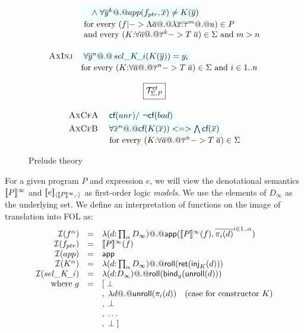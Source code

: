 \documentclass[preprint,nocopyrightspace]{sigplanconf}
\begin{document}
\begin{figure}
\[\begin{array}{c}
\begin{array}{lll}
                  & \formula{\quad\land\; \forall \oln{y}{k} @.@ app(f_{ptr},\xs) \neq K(\ol{y})} \\
                  & \text{ for every } (f |-> \Lambda\as @.@ \lambda\oln{x{:}\tau}{m} @.@ u) \in P  \\
                  & \text{ and every } (K{:}\forall\as @.@ \oln{\tau}{k} -> T\;\as) \in \Sigma \text{ and } m > n  \\ \\ 
 \textsc{AxInj}   & \formula{\forall \oln{y}{n} @.@ \sel{K}{i}(K(\ys)) = y_i} \\ 
                  & \text{for every } (K{:}\forall\as @.@ \oln{\tau}{n} -> T\;\as) \in \Sigma \text{ and } i \in 1..n \\ \\
\end{array} \\
\ruleform{\Th{\Sigma}{P}^{\lcfZ}} \\ \\ 
\begin{array}{lll} 
 \textsc{AxCfA}   & \formula{\lcf{\unr} /\ \lncf{\bad}} \\
 \textsc{AxCfB}   & \formula{\forall \oln{x}{n} @.@ \lcf{K(\ol{x})} <=> \bigwedge\lcf{\ol{x}}} \\
                  & \text{ for every } (K{:}\forall\as @.@ \oln{\tau}{n} -> T\;\as) \in \Sigma
\end{array}
\end{array}\]
\caption{Prelude theory}\label{fig:prelude}
\end{figure}


For a given program $P$ and expression $e$, we will view the denotational 
semantics $[\![P]\!]^{\infty}$ and $[\![e]\!]_{\langle {[\![P]\!]^\infty},{\cdot}\rangle}$ as first-order 
logic {\em models}. We use the elements of $D_{\infty}$ as the underlying set. We define
an interpretation of functions on the image of translation into FOL as: 
\[\begin{array}{rcl}
   {\cal I}(f^{\alpha})  & = & \mathsf{\lambda} (d {:} \prod_{\alpha}D_{\infty}) @.@ \mathsf{app}([\![P]\!]^{\infty}(f),\overline{\pi_i(d)}^{i \in 1..\alpha}) \\ 
   {\cal I}(f_{ptr})  & = & [\![P]\!]^{\infty}(f) \\ 
   {\cal I}(app)     & = & \mathsf{app} \\ 
   {\cal I}(K^{\alpha})  & = & \mathsf{\lambda} (d {:} \prod_{\alpha}D_{\infty}) @.@ \mathsf{roll}(\mathsf{ret}(\mathsf{inj}_{K}(d))) \\ 
   {\cal I}(\mathop{sel\_K\!\_i}) & = & \mathsf{\lambda} (d {:} D_{\infty}) @.@ \mathsf{roll}(\mathsf{bind}_g(\mathsf{unroll}(d))) \\ 
     \mbox{where } g  & = & [\;\bot \\ 
                      &   & ,\;\mathsf{\lambda} d @.@ \mathsf{unroll}(\pi_i(d))  \quad (\mbox{case for constructor } K) \\ 
                      &   & ,\;\bot \\ 
                      &   & ,\;\ldots\\ 
                      &   & ,\;\bot\; ]
\end{array}\]
\end{document}
